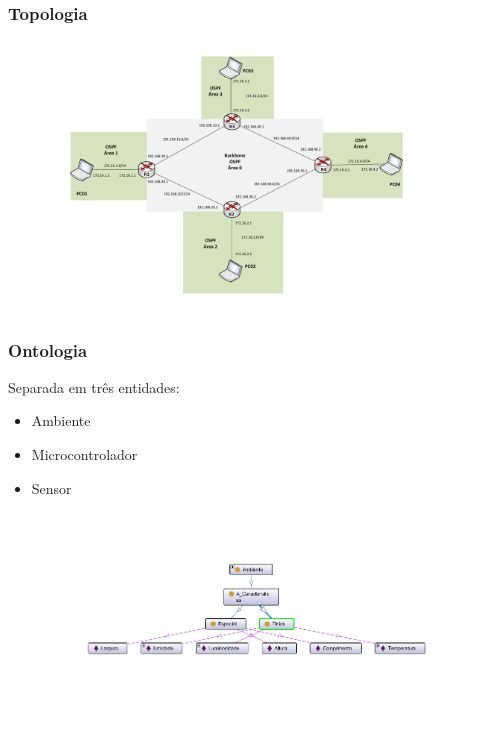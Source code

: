 
\begin{frame}
	\frametitle{Topologia}

	\begin{figure}[h]
		\centering
		\includegraphics[width=0.9\textwidth]{"../Relatorio/Artigo IoT-G4/figs/topologia-2"}
		\label{topologia}
 	\end{figure}

\end{frame}


\begin{frame}
	\frametitle{Ontologia}
	Separada em três entidades:
	\begin{itemize}
		\item Ambiente
		\item Microcontrolador
		\item Sensor
	\end{itemize}

	\begin{figure}[h]
		\centering
		\includegraphics[width=1.1\textwidth]{"../Relatorio/Artigo IoT-G4/figs/Ambiente"}
		\label{topologia}
 	\end{figure}

\end{frame}

